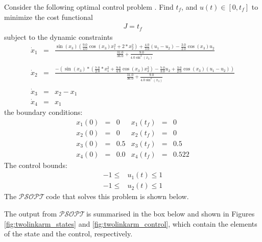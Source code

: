 \documentclass[a4paper,11pt]{report}    %
\newcommand{\psopt}{$\mathcal{PSOPT}$\,}  %
\newenvironment{shadedframe}{%
  \def\FrameCommand{\fcolorbox{black}{shadecolor}}%
  \MakeFramed {\FrameRestore}}
{\endMakeFramed}
\begin{document}
Consider the following optimal control problem \cite{Luus:02}.  Find $t_f$, and $u(t) \in [0, t_f]$ 
to minimize the cost functional
\begin{equation}
\begin{aligned}
  J = t_f
\end{aligned}
\end{equation}
subject to the dynamic constraints
\begin{equation}
  \begin{array}{lcl}
   \dot x_1 &=& \frac{\sin(x_3)( \frac{9.0}{4.0}\cos(x_3)x_1^2+2*x_2^2 )
                   + \frac{4.0}{3.0}(u_1-u_2)-\frac{3.0}{2.0}\cos(x_3)u_2}{\frac{31.0}{36.0} + \frac{9.0}{4.0\sin^2(x_3)}} \\ \\
   \dot x_2 &=& \frac{-(\sin(x_3)*(\frac{7.0}{2.0}*x_1^2+\frac{9.0}{4.0}\cos(x_3)x_2^2)
                   -\frac{7.0}{3.0}u_2+\frac{3.0}{2.0}\cos(x_3)(u_1-u_2))}{\frac{31.0}{36.0} + \frac{9.0}{4.0\sin^2(x_3)}} \\ \\
   \dot x_3 &=& x_2-x_1 \\
   \dot x_4 &=& x_1
  \end{array}
\end{equation}
the boundary conditions:
 \begin{equation}
  \begin{array}{cccccc}
   x_1(0) &=& 0   & x_1(t_f) &=& 0 \\
   x_2(0) &=& 0   & x_2(t_f) &=& 0\\
   x_3(0) &=& 0.5 & x_3(t_f) &=& 0.5\\
   x_4(0) &=& 0.0 & x_4(t_f) &=& 0.522 
  \end{array}
\end{equation}
The control bounds:
\begin{equation}
\begin{aligned}
  -1 \le &u_1(t) \le 1\\
  -1 \le &u_2(t) \le 1
\end{aligned}
\end{equation}
The
\psopt code that solves this problem is shown below.  

\tiny
\begin{shadedframe}

\end{shadedframe}
\normalsize
The output from \psopt is summarised in the box below and shown in Figures \ref{fig:twolinkarm_states} and \ref{fig:twolinkarm_control}, which contain the elements
of the state and the control, respectively.
\end{document}
